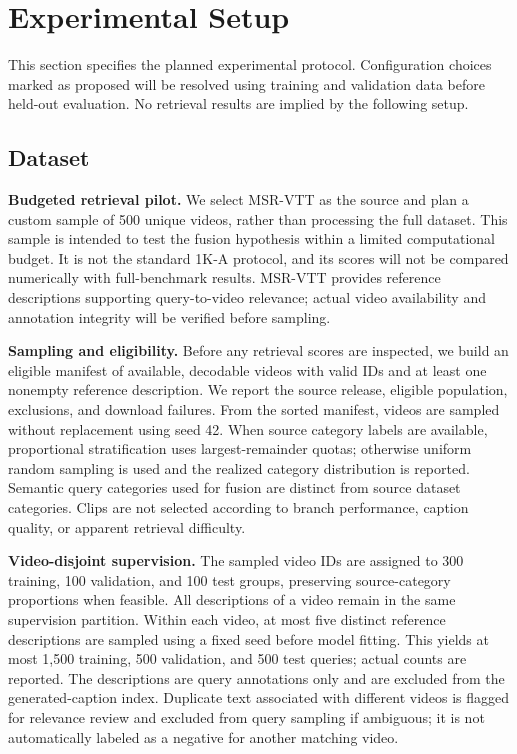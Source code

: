 \section{Experimental Setup}

This section specifies the planned experimental protocol. Configuration choices marked as proposed will be resolved using training and validation data before held-out evaluation. No retrieval results are implied by the following setup.

\subsection{Dataset}

\textbf{Budgeted retrieval pilot.} We select MSR-VTT \cite{xu2016msrvtt} as the source and plan a custom sample of 500 unique videos, rather than processing the full dataset. This sample is intended to test the fusion hypothesis within a limited computational budget. It is not the standard 1K-A protocol, and its scores will not be compared numerically with full-benchmark results. MSR-VTT provides reference descriptions supporting query-to-video relevance; actual video availability and annotation integrity will be verified before sampling.

\textbf{Sampling and eligibility.} Before any retrieval scores are inspected, we build an eligible manifest of available, decodable videos with valid IDs and at least one nonempty reference description. We report the source release, eligible population, exclusions, and download failures. From the sorted manifest, videos are sampled without replacement using seed 42. When source category labels are available, proportional stratification uses largest-remainder quotas; otherwise uniform random sampling is used and the realized category distribution is reported. Semantic query categories used for fusion are distinct from source dataset categories. Clips are not selected according to branch performance, caption quality, or apparent retrieval difficulty.

\textbf{Video-disjoint supervision.} The sampled video IDs are assigned to 300 training, 100 validation, and 100 test groups, preserving source-category proportions when feasible. All descriptions of a video remain in the same supervision partition. Within each video, at most five distinct reference descriptions are sampled using a fixed seed before model fitting. This yields at most 1,500 training, 500 validation, and 500 test queries; actual counts are reported. The descriptions are query annotations only and are excluded from the generated-caption index. Duplicate text associated with different videos is flagged for relevance review and excluded from query sampling if ambiguous; it is not automatically labeled as a negative for another matching video.

